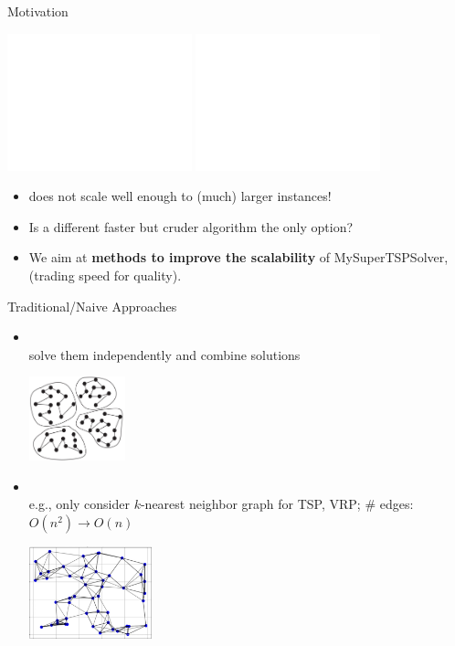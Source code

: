 \documentclass[aspectratio=1610]{beamer}
\newcommand{\important}[1]{{\color{green!60!black}#1}}
\begin{document}
\begin{frame}{Motivation}

	\begin{center}
	\includegraphics<1>[width=0.4\textwidth]{graphics/hybrid-motivation.pdf}
	\includegraphics<2>[width=0.4\textwidth]{graphics/hybrid-motivation2.pdf}
	\end{center}

	\begin{itemize}
		\item 
		 does not scale well enough to (much) larger instances!
	
		\item \alert{Is a different faster but cruder algorithm the only option?}
		\item<2> We aim at \important{\bf methods to improve the scalability} of MySuperTSPSolver,\\ (trading speed for quality).
	\end{itemize}
\end{frame}

\begin{frame}{Traditional/Naive Approaches}
	\begin{itemize}
	\item{\\
		solve them independently and combine solutions}\\
		\begin{center}
			\includegraphics[width=0.22\textwidth]{graphics/partition.jpg}
		\end{center}
	\item<2>{}\\
		e.g., only consider $k$-nearest neighbor graph for TSP, VRP; \# edges: $O(n^2)\rightarrow O(n)$\\
		\begin{center}
			\includegraphics[width=0.28\textwidth]{graphics/kNN-graph.jpg}
		\end{center}
	\end{itemize}
\end{frame}
\end{document}
